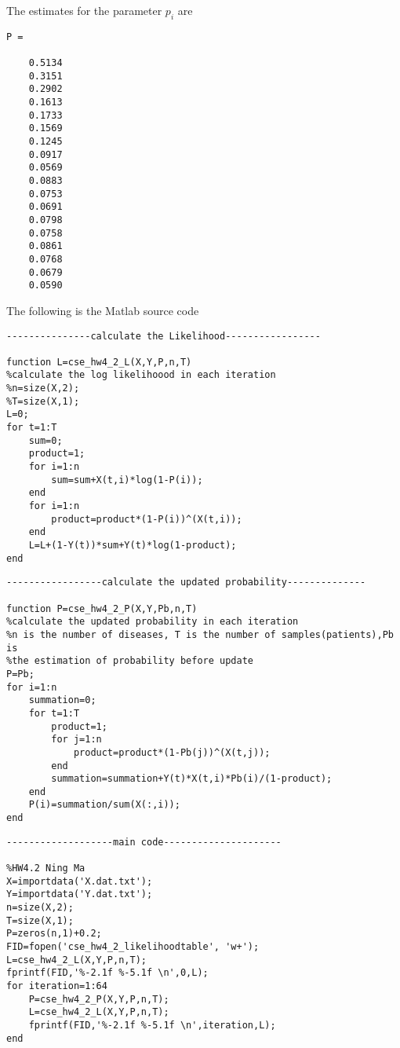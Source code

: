 \documentclass[12pt]{article} %
\theoremstyle{definition}\newtheorem{law}{Law}
\theoremstyle{plain}\newtheorem{jury}[law]{Jury}
\theoremstyle{remark}\newtheorem{juu}{Juu}
\theoremstyle{definition}\newtheorem{kuu}[law]{Kuu}
\theoremstyle{definition}\newtheorem{muu}{Muu}[section]
\theoremstyle{definition}\newtheorem{honoluu}{Honoluu}[section]
\theoremstyle{definition}\newtheorem{konoluu}[muu]{Konoluu}
\begin{document}
The estimates for the parameter $p_i$ are
\begin{lstlisting}
P =

    0.5134
    0.3151
    0.2902
    0.1613
    0.1733
    0.1569
    0.1245
    0.0917
    0.0569
    0.0883
    0.0753
    0.0691
    0.0798
    0.0758
    0.0861
    0.0768
    0.0679
    0.0590
\end{lstlisting}

The following is the Matlab source code\\

\begin{lstlisting}
---------------calculate the Likelihood-----------------

function L=cse_hw4_2_L(X,Y,P,n,T)
%calculate the log likelihoood in each iteration
%n=size(X,2);
%T=size(X,1);
L=0;
for t=1:T
    sum=0;
    product=1;
    for i=1:n
        sum=sum+X(t,i)*log(1-P(i));
    end
    for i=1:n
        product=product*(1-P(i))^(X(t,i));
    end
    L=L+(1-Y(t))*sum+Y(t)*log(1-product);
end
\end{lstlisting}

\begin{lstlisting}
-----------------calculate the updated probability--------------

function P=cse_hw4_2_P(X,Y,Pb,n,T)
%calculate the updated probability in each iteration
%n is the number of diseases, T is the number of samples(patients),Pb is
%the estimation of probability before update
P=Pb;
for i=1:n
    summation=0;
    for t=1:T
        product=1;
        for j=1:n
            product=product*(1-Pb(j))^(X(t,j));
        end
        summation=summation+Y(t)*X(t,i)*Pb(i)/(1-product);
    end
    P(i)=summation/sum(X(:,i));
end
\end{lstlisting}
        
\begin{lstlisting}
-------------------main code---------------------

%HW4.2 Ning Ma
X=importdata('X.dat.txt');
Y=importdata('Y.dat.txt');
n=size(X,2);
T=size(X,1);
P=zeros(n,1)+0.2;
FID=fopen('cse_hw4_2_likelihoodtable', 'w+');
L=cse_hw4_2_L(X,Y,P,n,T);
fprintf(FID,'%-2.1f %-5.1f \n',0,L);
for iteration=1:64
    P=cse_hw4_2_P(X,Y,P,n,T);
    L=cse_hw4_2_L(X,Y,P,n,T);
    fprintf(FID,'%-2.1f %-5.1f \n',iteration,L);
end
\end{lstlisting}
\end{document}
